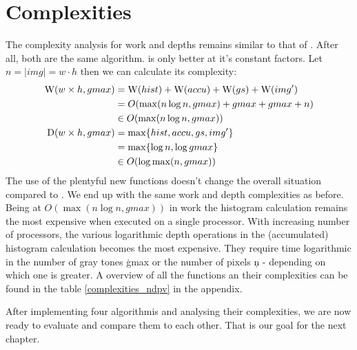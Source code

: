 \section{Complexities}
  The complexity analysis for work and depths remains similar to that of \ndpn.
  After all, both are the same algorithm. \ndpv is only better at it's constant factors.
  Let $n = |img| = w\cdot h$ then we can calculate its complexity:
  \begin{equation}
  \begin{split}
  \W(w \times h,gmax)
        & = \W(hist) + \W(accu) + \W(gs) + \comment{\W(expandPS) +} \W(img') \\
        & = O( \max(n \log n, gmax) + gmax + gmax \comment{ + 1} + n) \\
        & \in O(\max(n \log n, gmax)) \\
  \D(w \times h,gmax)
      & = \max \{ hist, accu, gs\comment{, expandPS}, img'\} \\
      & = \max \{\log n, \log gmax \} \\
      & \in O(\log \max(n,gmax)) \\
  \end{split}
  \end{equation}
  The use of the plentyful new functions doesn't change the overall situation compared to \ndpn.
  We end up with the same work and depth complexities as before. Being at $O(\max(n \log n,gmax))$ in work
  the histogram calculation remains the most expensive when executed on a single processor.
  With increasing number of processors, the various logarithmic depth
  operations in the (accumulated) histogram calculation becomes the most expensive.
  They require time logarithmic in the number of gray tones \c{gmax} or the number
  of pixels \c{n} - depending on which one is greater.
  A overview of all the functions an their complexities can be found in the table \ref{complexities_ndpv} in the appendix.
  
  After implementing four algorithmis and analysing their complexities, we are now ready
  to evaluate and compare them to each other. That is our goal for the next chapter.
  
  
  
  
